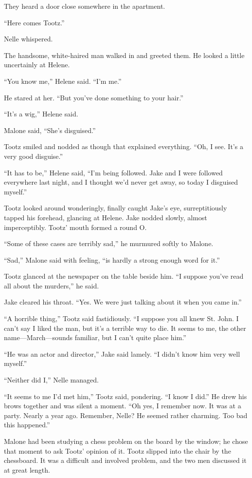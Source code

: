 \documentclass{novel}
\begin{document}
They heard a door close somewhere in the apartment.

“Here comes Tootz.”

Nelle whispered.

The handsome, white-haired man walked in and greeted them. He looked a little uncertainly at Helene.

“You know me,” Helene said. “I’m me.”

He stared at her. “But you’ve done something to your hair.”

“It’s a wig,” Helene said.

Malone said, “She’s disguised.”

Tootz smiled and nodded as though that explained everything. “Oh, I see. It’s a very good disguise.”

“It has to be,” Helene said, “I’m being followed. Jake and I were followed everywhere last night, and I thought we’d never get away, so today I disguised myself.”

Tootz looked around wonderingly, finally caught Jake’s eye, surreptitiously tapped his forehead, glancing at Helene. Jake nodded slowly, almost imperceptibly. Tootz’ mouth formed a round O.

“Some of these cases are terribly sad,” he murmured softly to Malone.

“Sad,” Malone said with feeling, “is hardly a strong enough word for it.”

Tootz glanced at the newspaper on the table beside him. “I suppose you’ve read all about the murders,” he said.

Jake cleared his throat. “Yes. We were just talking about it when you came in.”

“A horrible thing,” Tootz said fastidiously. “I suppose you all knew St. John. I can’t say I liked the man, but it’s a terrible way to die. It seems to me, the other name—March—sounds familiar, but I can’t quite place him.”

“He was an actor and director,” Jake said lamely. “I didn’t know him very well myself.”

“Neither did I,” Nelle managed.

“It seems to me I’d met him,” Tootz said, pondering. “I know I did.” He drew his brows together and was silent a moment. “Oh yes, I remember now. It was at a party. Nearly a year ago. Remember, Nelle? He seemed rather charming. Too bad this happened.”

Malone had been studying a chess problem on the board by the window; he chose that moment to ask Tootz’ opinion of it. Tootz slipped into the chair by the chessboard. It was a difficult and involved problem, and the two men discussed it at great length.
\end{document}
